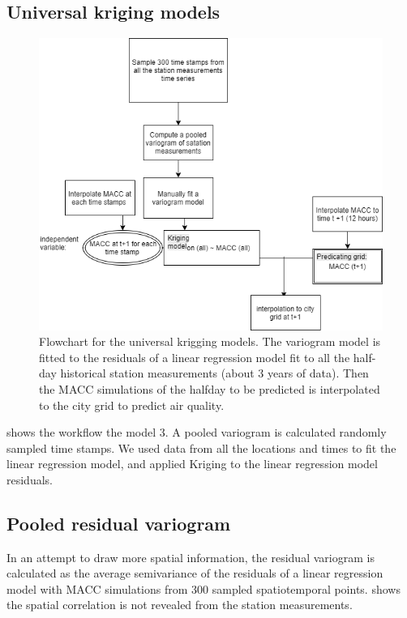 \documentclass{article}
\begin{document}
\subsection{Universal kriging models}

\begin{figure}[tbp]
\includegraphics[width=\columnwidth]{diaM3.png}
\caption{Flowchart for the universal krigging models. The variogram model is fitted to the residuals of a linear regression model fit to all the half-day historical
  station measurements (about 3 years of data). Then the MACC simulations of the halfday to be predicted is interpolated to the city grid to predict air quality.}
\label{fig:UK}
\end{figure}

 shows the workflow the model 3. A pooled variogram is calculated randomly sampled time stamps. We used data from all the
locations and times to fit the linear regression model, and applied
Kriging to the linear regression model residuals.


\subsection{Pooled residual variogram}

In an attempt to draw more spatial information, the residual variogram   is calculated as the average semivariance of the residuals of a linear regression model with MACC simulations from 300 sampled spatiotemporal points.  shows the spatial correlation is not revealed from the station measurements. 
\end{document}
